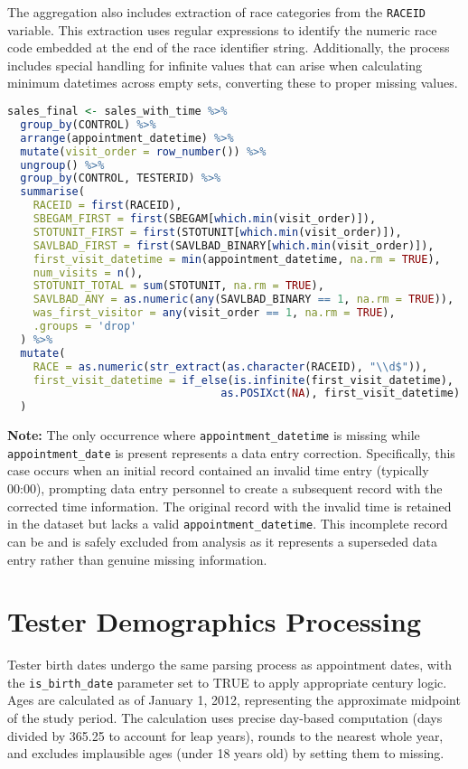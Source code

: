 \documentclass{article}
\begin{document}
The aggregation also includes extraction of race categories from the \texttt{RACEID} variable. This extraction uses regular expressions to identify the numeric race code embedded at the end of the race identifier string. Additionally, the process includes special handling for infinite values that can arise when calculating minimum datetimes across empty sets, converting these to proper missing values.

\begin{lstlisting}[language=R]
sales_final <- sales_with_time %>%
  group_by(CONTROL) %>%
  arrange(appointment_datetime) %>%
  mutate(visit_order = row_number()) %>%
  ungroup() %>%
  group_by(CONTROL, TESTERID) %>%
  summarise(
    RACEID = first(RACEID),
    SBEGAM_FIRST = first(SBEGAM[which.min(visit_order)]),
    STOTUNIT_FIRST = first(STOTUNIT[which.min(visit_order)]),
    SAVLBAD_FIRST = first(SAVLBAD_BINARY[which.min(visit_order)]),
    first_visit_datetime = min(appointment_datetime, na.rm = TRUE),
    num_visits = n(),
    STOTUNIT_TOTAL = sum(STOTUNIT, na.rm = TRUE),
    SAVLBAD_ANY = as.numeric(any(SAVLBAD_BINARY == 1, na.rm = TRUE)),
    was_first_visitor = any(visit_order == 1, na.rm = TRUE),
    .groups = 'drop'
  ) %>%
  mutate(
    RACE = as.numeric(str_extract(as.character(RACEID), "\\d$")),
    first_visit_datetime = if_else(is.infinite(first_visit_datetime), 
                                 as.POSIXct(NA), first_visit_datetime)
  )
\end{lstlisting}

\textbf{Note:} The only occurrence where \texttt{appointment\_datetime} is missing while \texttt{appointment\_date} is present represents a data entry correction. Specifically, this case occurs when an initial record contained an invalid time entry (typically 00:00), prompting data entry personnel to create a subsequent record with the corrected time information. The original record with the invalid time is retained in the dataset but lacks a valid \texttt{appointment\_datetime}. This incomplete record can be and is safely excluded from analysis as it represents a superseded data entry rather than genuine missing information.

\section{Tester Demographics Processing}

Tester birth dates undergo the same parsing process as appointment dates, with the \texttt{is\_birth\_date} parameter set to TRUE to apply appropriate century logic. Ages are calculated as of January 1, 2012, representing the approximate midpoint of the study period. The calculation uses precise day-based computation (days divided by 365.25 to account for leap years), rounds to the nearest whole year, and excludes implausible ages (under 18 years old) by setting them to missing.
\end{document}
